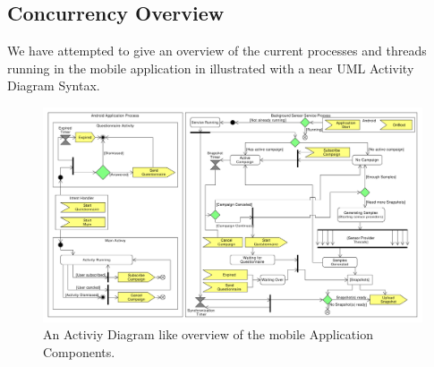 \subsection{Concurrency Overview}
We have attempted to give an overview of the current processes and threads running in the mobile application in  illustrated with a near UML Activity Diagram Syntax. 

\begin{figure}[!htbp]
    \centering
    \includegraphics[width=\textwidth]{graphic/backgroundsensorservice/lifecyclestuff.pdf}
    \caption{An Activiy Diagram like overview of the mobile Application Components.}
    \label{fig:system_currency_and_lifecycle}
\end{figure}
\FloatBarrier